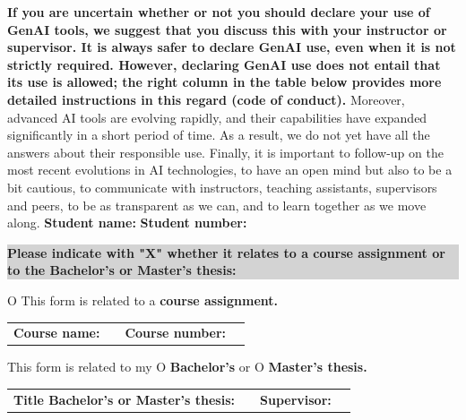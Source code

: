 \textbf{If you are uncertain whether or not you should declare your use of GenAI tools, we suggest that you discuss this with your instructor or supervisor. It is always safer to declare GenAI use, even when it is not strictly required. However, declaring GenAI use does not entail that its use is allowed; the right column in the table below provides more detailed instructions in this regard (code of conduct). }
\newline
\newline
Moreover, advanced AI tools are evolving rapidly, and their capabilities have expanded significantly in a short period of time. As a result, we do not yet have all the answers about their responsible use. Finally, it is important to follow-up on the most recent evolutions in AI technologies, to have an open mind but also to be a bit cautious, to communicate with instructors, teaching assistants, supervisors and peers, to be as transparent as we can, and to learn together as we move along.
\newpage
\noindent
\textbf{Student name:} \dotfill \hfill \textbf{Student number:} \dotfill

\vspace{1em}

\noindent
\colorbox{lightgray}{\parbox{\dimexpr\linewidth-2\fboxsep\relax}{\textbf{Please indicate with "X" whether it relates to a course assignment or to the Bachelor’s or Master’s thesis:}}}

\vspace{1em}

O This form is related to a \textbf{course assignment.}

\begin{tabularx}{\linewidth}{@{}lXlX@{}}
\textbf{Course name:} & \dotfill & \textbf{Course number:} & \dotfill \\
\end{tabularx}

\vspace{1em}

This form is related to my O \textbf{Bachelor’s} or O \textbf{Master’s thesis.}

\begin{tabularx}{\linewidth}{@{}lXlX@{}}
\textbf{Title Bachelor’s or Master’s thesis:} & \dotfill & \textbf{Supervisor:} & \dotfill \\
\end{tabularx}

\vspace{1em}

